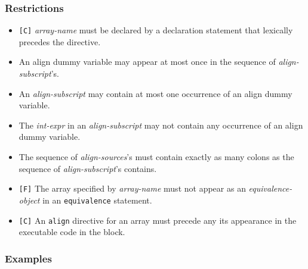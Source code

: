 \subsubsection*{Restrictions}

\begin{itemize}
 \item \verb![C]! {\it array-name} must be declared by a declaration
       statement that lexically precedes the directive.
\item An align dummy variable may appear at most once in the sequence of
      {\it align-subscript}'s.
\item An {\it align-subscript} may contain at most one occurrence of an
      align dummy variable.
\item The {\it int-expr} in an {\it align-subscript} may not contain any
      occurrence of an align dummy variable.
\item The sequence of {\it align-sources}'s must contain exactly as many
      colons as the sequence of {\it align-subscript}'s contains.
\item \verb![F]! The array specified by {\it array-name} must not appear
      as an {\it equivalence-object} in an {\tt equivalence} statement.
\item \verb![C]! An {\tt align} directive for an array must
      precede any its appearance in the executable code in the block.
\end{itemize}

\subsubsection*{Examples}

